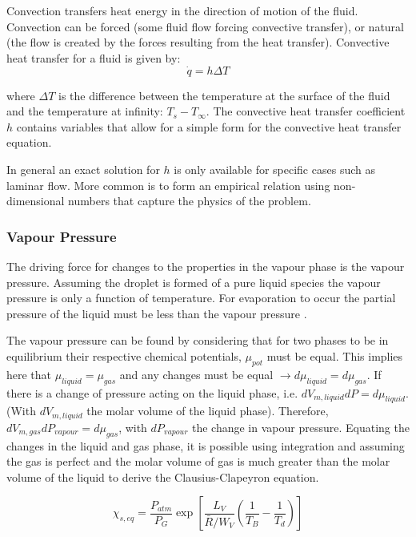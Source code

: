 \documentclass[../Interim_Report_Master]{subfiles}
\begin{document}
Convection transfers heat energy in the direction of motion of the fluid. Convection can be forced (some fluid flow forcing convective transfer), or natural (the flow is created by the forces resulting from the heat transfer). Convective heat transfer for a fluid is given by:
\begin{equation}
\dot{q} = h\Delta T
\end{equation}

where $\Delta T$ is the difference between the temperature at the surface of the fluid and the temperature at infinity: $T_s-T_{\infty}$. The convective heat transfer coefficient $h$ contains variables that allow for a simple form for the convective heat transfer equation.\cite{Shrimpton2015}

In general an exact solution for $h$ is only available for specific cases such as laminar flow. More common is to form an empirical relation using non-dimensional numbers that capture the physics of the problem. \cite{Deiterding20192}

\subsubsection{Vapour Pressure}
The driving force for changes to the properties in the vapour phase is the vapour pressure. Assuming the droplet is formed of a pure liquid species the vapour pressure is only a function of temperature. For evaporation to occur the partial pressure of the liquid must be less than the vapour pressure \cite{Nazaroff2001}. 

The vapour pressure can be found by considering that for two phases to be in equilibrium their respective chemical potentials, $\mu_{pot}$ must be equal. This implies here that $\mu_{liquid}=\mu_{gas}$ and any changes must be equal $\to d\mu_{liquid}=d\mu_{gas}$. If there is a change of pressure acting on the liquid phase, i.e. $dV_{m, liquid}dP=d\mu_{liquid}$. (With $dV_{m, liquid}$ the molar volume of the liquid phase). Therefore, $dV_{m, gas}dP_{vapour}=d\mu_{gas}$, with $dP_{vapour}$ the change in vapour pressure. Equating the changes in the liquid and gas phase, it is possible using integration and assuming the gas is perfect and the molar volume of gas is much greater than the molar volume of the liquid to derive the Clausius-Clapeyron equation. \cite{atkins_paula_2010}

\begin{equation}
\chi_{s,eq} = \frac{P_{atm}}{P_G}\exp \left[\frac{L_V}{\bar{R}/W_V}\left(\frac{1}{T_B}-\frac{1}{T_d}\right)\right] 
\end{equation}
\end{document}
